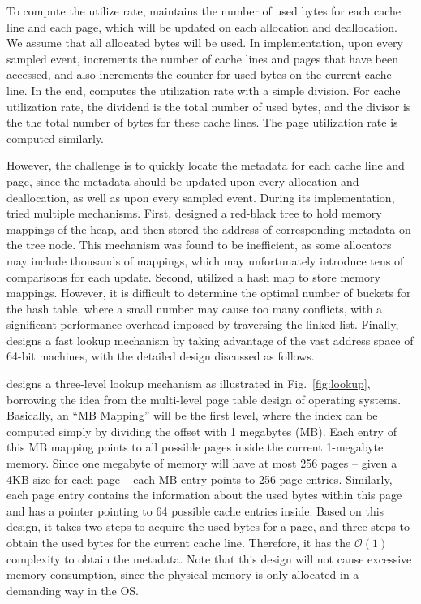 To compute the utilize rate, \MP{} maintains the number of used bytes for each cache line and each page, which will be updated on each allocation and deallocation. We assume that all allocated bytes will be used. In implementation, upon every sampled event, \MP{} increments the number of cache lines and pages that have been accessed, and also increments the counter for used bytes on the current cache line. In the end, \MP{} computes the utilization rate with a simple division. For cache utilization rate, the dividend is the total number of used bytes, and the divisor is the the total number of bytes for these cache lines. The page utilization rate is computed similarly.

However, the challenge is to quickly locate the metadata for each cache line and page, since the metadata should be updated upon every allocation and deallocation, as well as upon every sampled event. During its implementation, \MP{} tried multiple mechanisms. First, \MP{} designed a red-black tree to hold memory mappings of the heap, and then stored the address of corresponding metadata on the tree node. This mechanism was found to be inefficient, as some allocators may include thousands of mappings, which may unfortunately introduce tens of comparisons for each update. Second, \MP{} utilized a hash map to store memory mappings. However, it is difficult to determine the optimal number of buckets for the hash table, where a small number may cause too many conflicts, with a significant performance overhead imposed by traversing the linked list. Finally, \MP{} designs a fast lookup mechanism by taking advantage of the vast address space of 64-bit machines, with the detailed design discussed as follows. 

\MP{} designs a three-level lookup mechanism as illustrated in Fig.~\ref{fig:lookup}, borrowing the idea from the multi-level page table design of operating systems. Basically, an ``MB Mapping'' will be the first level, where the index can be computed simply by dividing the offset with 1 megabytes (MB). Each entry of this MB mapping points to all possible pages inside the current 1-megabyte memory. Since one megabyte of memory will have at most 256 pages -- given a 4KB size for each page -- each MB entry points to 256 page entries. Similarly, each page entry contains the information about the used bytes within this page and has a pointer pointing to 64 possible cache entries inside. Based on this design, it takes two steps to acquire the used bytes for a page, and three steps to obtain the used bytes for the current cache line. Therefore, it has the $\mathcal{O}(1)$ 
complexity to obtain the metadata. Note that this design will not cause excessive memory consumption, since the physical memory is only allocated in a demanding way in the OS. 
 
